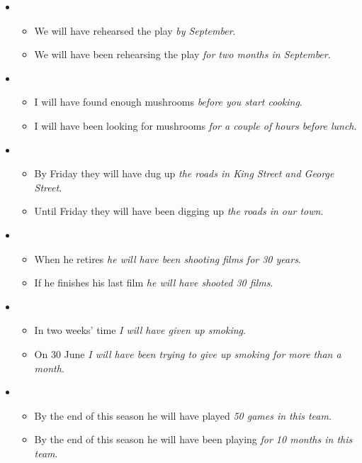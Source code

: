 \begin{itemize}

\item
\begin{itemize}
\item We will have rehearsed the play \textit{by September}.
\item We will have been rehearsing the play \textit{for two months in September}.
\end{itemize}

\item
\begin{itemize}
\item I will have found enough mushrooms \textit{before you start cooking}.
\item I will have been looking for mushrooms \textit{for a couple of hours before lunch}.
\end{itemize}

\item
\begin{itemize}
\item By Friday they will have dug up \textit{the roads in King Street and George Street}.
\item Until Friday they will have been digging up \textit{the roads in our town}.
\end{itemize}

\item
\begin{itemize}
\item When he retires \textit{he will have been shooting films for 30 years}.
\item If he finishes his last film \textit{he will have shooted 30 films}.
\end{itemize}

\item
\begin{itemize}
\item In two weeks' time \textit{I will have given up smoking}.
\item On 30 June \textit{I will have been trying to give up smoking for more than a month}.
\end{itemize}

\item
\begin{itemize}
\item By the end of this season he will have played \textit{50 games in this team}.
\item By the end of this season he will have been playing \textit{for 10 months in this team}.
\end{itemize}


\end{itemize}
